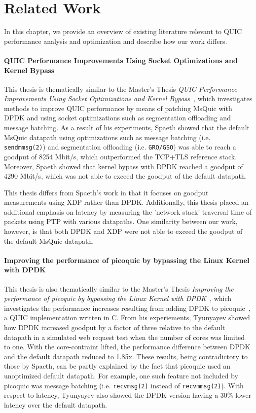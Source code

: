 \chapter{Related Work}
\label{chap:related-work}
In this chapter, we provide an overview of existing literature relevant to QUIC performance analysis and optimization and describe how our work differs.

\subsubsection{QUIC Performance Improvements Using Socket Optimizations and Kernel Bypass}
\label{subsubsec:spaeth-thesis}
This thesis is thematically similar to the Master's Thesis \emph{QUIC Performance Improvements Using Socket Optimizations and Kernel Bypass}~\cite{spaeth2023}, which investigates methods to improve QUIC performance by means of patching MsQuic with \ac{DPDK} and using socket optimizations such as segmentation offloading and message batching. As a result of his experiments, Spaeth showed that the default MsQuic datapath using optimizations such as message batching (i.e. \texttt{sendmmsg(2)}) and segmentation offloading (i.e. \texttt{GRO/GSO}) was able to reach a goodput of 8254 Mbit/s, which outperformed the \ac{TCP}+\ac{TLS} reference stack. Moreover, Spaeth showed that kernel bypass with \ac{DPDK} reached a goodput of 4290 Mbit/s, which was not able to exceed the goodput of the default datapath.

This thesis differs from Spaeth's work in that it focuses on goodput measurements using \ac{XDP} rather than \ac{DPDK}. Additionally, this thesis placed an additional emphasis on latency by measuring the 'network stack' traversal time of packets using \ac{PTP} with various datapaths. One similarity between our work, however, is that both \ac{DPDK} and \ac{XDP} were not able to exceed the goodput of the default MsQuic datapath.

\subsubsection{Improving the performance of picoquic by bypassing the Linux Kernel with DPDK}
\label{subsubsec:nikita-thesis}
This thesis is also thematically similar to the Master's Thesis \emph{Improving the performance of picoquic by bypassing the Linux Kernel with DPDK}~\cite{nikita2021}, which investigates the performance increases resulting from adding DPDK to picoquic~\cite{picoquic}, a QUIC implementation written in C. From his experiements, Tyunyayev showed how \ac{DPDK} increased goodput by a factor of three relative to the default datapath in a simulated web request test when the number of cores was limited to one. With the core-contraint lifted, the performance difference between \ac{DPDK} and the default datapath reduced to 1.85x. These results, being contradictory to those by Spaeth, can be partly explained by the fact that picoquic used an unoptimized default datapath. For example, one such feature not included by picoquic was message batching (i.e. \texttt{recvmsg(2)} instead of \texttt{recvmmsg(2)}). With respect to latency, Tyunyayev also showed the \ac{DPDK} version having a 30\% lower latency over the default datapath.

